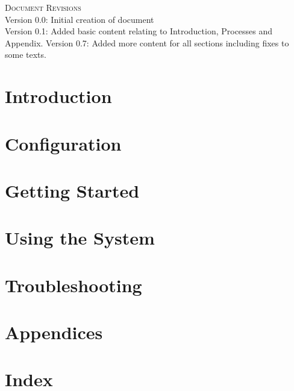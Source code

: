 \documentclass[a4paper,12pt]{report}
\begin{document}
\renewcommand{\thesection}{\arabic{section}}
\newpage
\tableofcontents{}
\newpage
\begin{center}
\textsc{\LARGE Document Revisions}\\[1.5cm]
 Version 0.0: Initial creation of document \\
 Version 0.1: Added basic content relating to Introduction, Processes and Appendix.
  Version 0.7: Added more content for all sections including fixes to some texts.

 
\end{center}
\newpage
\section{Introduction}
	
	\section{Configuration}
	
\section{Getting Started}
	
	\section{Using the System}
	
	\section{Troubleshooting}
	
\section{Appendices}
	
\section{Index}
	
\end{document}
